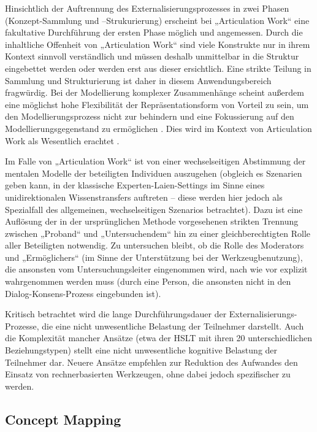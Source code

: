 Hinsichtlich der Auftrennung des Externalisierungsprozesses in zwei Phasen (Konzept-Sammlung und –Strukurierung) erscheint bei „Articulation Work“ eine fakultative Durchführung der ersten Phase möglich und angemessen. Durch die inhaltliche Offenheit von „Articulation Work“ sind viele Konstrukte nur in ihrem Kontext sinnvoll verständlich und müssen deshalb unmittelbar in die Struktur eingebettet werden oder werden erst aus dieser ersichtlich. Eine strikte Teilung in Sammlung und Strukturierung ist daher in diesem Anwendungsbereich fragwürdig. Bei der Modellierung komplexer Zusammenhänge scheint außerdem eine möglichst hohe Flexibilität der Repräsentationsform von Vorteil zu sein, um den Modellierungsprozess nicht zur behindern und eine Fokussierung auf den Modellierungsgegenstand zu ermöglichen \citep[][S. 6]{Goguen93}. Dies wird im Kontext von Articulation Work als Wesentlich erachtet \citep[][S. 10]{Schmidt00}. 

Im Falle von „Articulation Work“ ist von einer wechselseitigen Abstimmung der mentalen Modelle der beteiligten Individuen auszugehen (obgleich es Szenarien geben kann, in der klassische Experten-Laien-Settings im Sinne eines unidirektionalen Wissenstransfers auftreten – diese werden hier jedoch als Spezialfall des allgemeinen, wechselseitigen Szenarios betrachtet). Dazu ist eine Auflösung der in der ursprünglichen Methode vorgesehenen strikten Trennung zwischen „Proband“ und „Untersuchendem“ hin zu einer gleichberechtigten Rolle aller Beteiligten notwendig. Zu untersuchen bleibt, ob die Rolle des Moderators und „Ermöglichers“ (im Sinne der Unterstützung bei der Werkzeugbenutzung), die ansonsten vom Untersuchungsleiter eingenommen wird, nach wie vor explizit wahrgenommen werden muss (durch eine Person, die ansonsten nicht in den Dialog-Konsens-Prozess eingebunden ist).

Kritisch betrachtet wird die lange Durchführungsdauer der Externalisierungs-Prozesse, die eine nicht unwesentliche Belastung der Teilnehmer darstellt. Auch die Komplexität mancher Ansätze (etwa der \gls{HSLT} mit ihren 20 unterschiedlichen Beziehungstypen) stellt eine nicht unwesentliche kognitive Belastung der Teilnehmer dar.  Neuere Ansätze empfehlen zur Reduktion des Aufwandes den Einsatz von rechnerbasierten Werkzeugen, ohne dabei jedoch spezifischer zu werden. \citet[][S. 29f]{Ifenthaler06}

\subsection{Concept Mapping} %
\label{sub:concept_mapping}

